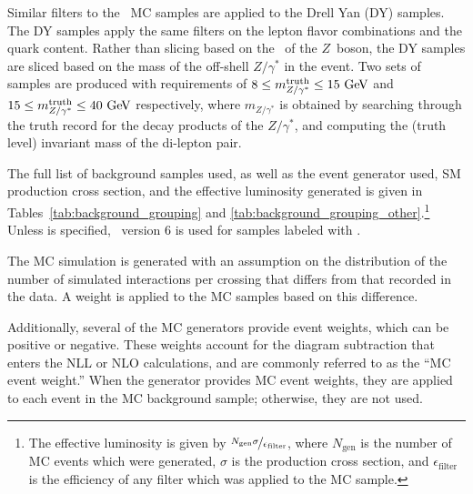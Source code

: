 Similar filters to the \ZGAMMAJETS\ MC samples are applied to the Drell Yan (DY)
samples.
The DY samples apply the same filters on the lepton flavor combinations
and the quark content.
Rather than slicing based on the \pt\ of the $Z$~boson, the DY samples are
sliced based on the mass of the off-shell $Z/\gamma^{*}$ in the event.
Two sets of samples are produced with requirements of
$8 \leq m_{Z/\gamma^{*}}^\mathrm{truth} \leq 15 \GeV$ and 
$15 \leq m_{Z/\gamma^{*}}^\mathrm{truth} \leq 40 \GeV$ respectively, where
$m_{Z/\gamma^{*}}$ is obtained by searching through the truth record for the
decay products of the $Z/\gamma^{*}$, and computing the (truth level) invariant
mass of the di-lepton pair.

The full list of background samples used, as well as the event generator used,
SM production cross section, and the effective luminosity generated is given in 
Tables~\ref{tab:background_grouping}
and \ref{tab:background_grouping_other}.\footnote{The effective luminosity is
given by $\nicefrac{N_\mathrm{gen}\sigma}{\epsilon_\mathrm{filter}}$, where
$N_\mathrm{gen}$ is the number of MC events which were generated, $\sigma$ is
the production cross section, and $\epsilon_\mathrm{filter}$ is the efficiency
of any filter which was applied to the MC sample.}
Unless  is specified, \pythia\ version 6 is used for samples labeled
with \pythia.

The MC simulation is generated with an assumption on the distribution of
the number of simulated interactions per crossing that differs from that
recorded in the data.
A weight is applied to the MC samples based on this difference.

Additionally, several of the MC generators provide event weights, which can
be positive or negative.
These weights account for the diagram subtraction that enters the NLL or NLO
calculations, and are commonly referred to as the ``MC event weight.''
When the generator provides MC event weights, they are applied to each event in
the MC background sample; otherwise, they are not used.

